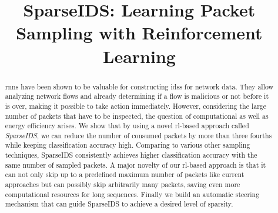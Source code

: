 \documentclass[conference]{IEEEtran}
\begin{document}
\title{SparseIDS: Learning Packet Sampling with Reinforcement Learning}

\author{
}




\maketitle%



\newcommand{\ours}{SparseIDS}

\begin{abstract}

\glspl{rnn} have been shown to be valuable for constructing \glspl{ids} for network data. They allow analyzing network flows and already determining if a flow is malicious or not before it is over, making it possible to take action immediately. However, considering the large number of packets that have to be inspected, the question of computational as well as energy efficiency arises. We show that by using a novel \gls{rl}-based approach called \textit{\ours{}}, we can reduce the number of consumed packets by more than three fourths while keeping classification accuracy high. Comparing to various other sampling techniques, \ours{} consistently achieves higher classification accuracy with the same number of sampled packets. A major novelty of our \gls{rl}-based approach is that it can not only skip up to a predefined maximum number of packets like current approaches but can possibly skip arbitrarily many packets, saving even more computational resources for long sequences. Finally we build an automatic steering mechanism that can guide \ours{} to achieve a desired level of sparsity. 

\end{abstract}
\end{document}
